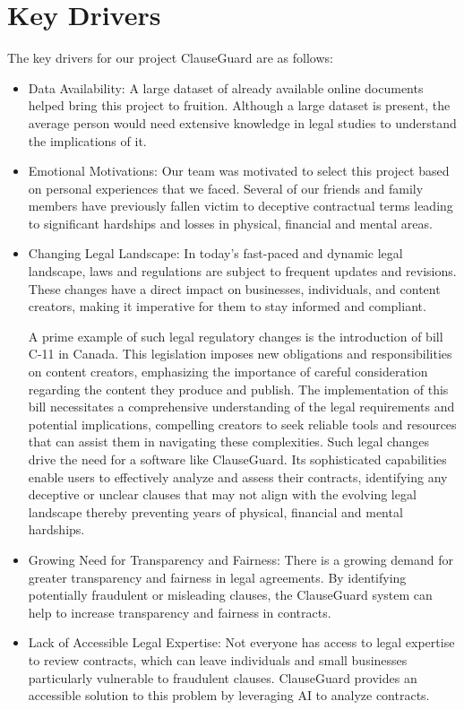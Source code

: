 \section{Key Drivers \label{Section::Key Drivers} }
The key drivers for our project ClauseGuard are as follows: 
\begin{itemize}
    \item Data Availability: A large dataset of already available online documents helped bring this project to fruition. Although a large dataset is present, the average person would need extensive knowledge in legal studies to understand the implications of it. 
    \item Emotional Motivations: Our team was motivated to select this project based on personal experiences that we faced. Several of our friends and family members have previously fallen victim to deceptive contractual terms leading to significant hardships and losses in physical, financial and mental areas. 
    \item Changing Legal Landscape: In today's fast-paced and dynamic legal landscape, laws and regulations are subject to frequent updates and revisions. These changes have a direct impact on businesses, individuals, and content creators, making it imperative for them to stay informed and compliant.

A prime example of such legal regulatory changes is the introduction of bill C-11 in Canada. This legislation imposes new obligations and responsibilities on content creators, emphasizing the importance of careful consideration regarding the content they produce and publish. The implementation of this bill necessitates a comprehensive understanding of the legal requirements and potential implications, compelling creators to seek reliable tools and resources that can assist them in navigating these complexities. 
Such legal changes drive the need for a software like ClauseGuard. Its sophisticated capabilities enable users to effectively analyze and assess their contracts, identifying any deceptive or unclear clauses that may not align with the evolving legal landscape thereby preventing years of physical, financial and mental hardships.

\item Growing Need for Transparency and Fairness: There is a growing demand for greater transparency and fairness in legal agreements. By identifying potentially fraudulent or misleading clauses, the ClauseGuard system can help to increase transparency and fairness in contracts.

\item Lack of Accessible Legal Expertise: Not everyone has access to legal expertise to review contracts, which can leave individuals and small businesses particularly vulnerable to fraudulent clauses. ClauseGuard provides an accessible solution to this problem by leveraging AI to analyze contracts.
\end{itemize}



